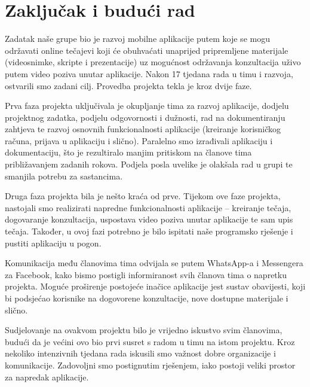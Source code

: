 \chapter{Zaključak i budući rad}
		
		\text Zadatak naše grupe bio je razvoj mobilne aplikacije putem koje se mogu održavati online tečajevi koji će obuhvaćati unaprijed pripremljene materijale (videosnimke, skripte i prezentacije) uz mogućnost održavanja konzultacija uživo putem video poziva unutar aplikacije. Nakon 17 tjedana rada u timu i razvoja, ostvarili smo zadani cilj. Provedba projekta tekla je kroz dvije faze.
		
		\text Prva faza projekta uključivala je okupljanje tima za razvoj aplikacije, dodjelu projektnog zadatka, podjelu odgovornosti i dužnosti, rad na dokumentiranju zahtjeva te razvoj osnovnih funkcionalnosti aplikacije (kreiranje korisničkog računa, prijava u aplikaciju i slično). Paralelno smo izrađivali aplikaciju i dokumentaciju, što je rezultiralo manjim pritiskom na članove tima približavanjem zadanih rokova. Podjela posla uvelike je olakšala rad u grupi te smanjila potrebu za sastancima.		
		
		Druga faza projekta bila je nešto kraća od prve. Tijekom ove faze projekta, nastojali smo realizirati napredne funkcionalnosti aplikacije – kreiranje tečaja, dogovaranje konzultacija, uspostava video poziva unutar aplikacije te sam upis tečaja. Također, u ovoj fazi potrebno je bilo ispitati naše programsko rješenje i pustiti aplikaciju u pogon.
		
		Komunikacija među članovima tima odvijala se putem WhatsApp-a i Messengera za Facebook, kako bismo postigli informiranost svih članova tima o napretku projekta.  Moguće proširenje postojeće inačice aplikacije jest sustav obavijesti, koji bi podsjećao korisnike na dogovorene konzultacije, nove dostupne materijale i slično.
		
		Sudjelovanje na ovakvom projektu bilo je vrijedno iskustvo svim članovima, budući da je većini ovo bio prvi susret s radom u timu na istom projektu. Kroz nekoliko intenzivnih tjedana rada iskusili smo važnost dobre organizacije i komunikacije. Zadovoljni smo postignutim rješenjem, iako postoji veliki prostor za napredak aplikacije.
		
		
		\eject 